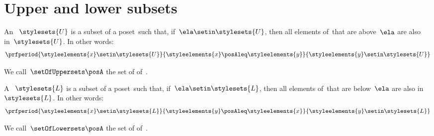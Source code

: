 
\section{Upper and lower subsets}
\label{sec:UpperLowerSets}

\begin{definition}
    \label{def:upperset}
    An ~$\stylesets{U}$ is a subset of a poset~\posA such that, if~$\ela \setin \stylesets{U}$, then all elements of~\posA that are above~$\ela$ are also in~$\stylesets{U}$.
    In other words:
    \begin{equation}
        \prfperiod{\styleelements{x}\setin \stylesets{U}}{\styleelements{x}\posAleq \styleelements{y}}{\styleelements{y}\setin \stylesets{U}}
    \end{equation}
\end{definition}
We call~$\setOfUppersets \posA$ the set of  of~\posA.

\begin{definition}
    \label{def:lowerset}
    A ~$\stylesets{L}$ is a subset of a poset~\posA such that, if~$\ela \setin \stylesets{L}$, then all elements of~\posA that are below~$\ela$ are also in~$\stylesets{L}$.
    In other words:
    \begin{equation}
        \prfperiod{\styleelements{x}\setin \stylesets{L}}{\styleelements{y}\posAleq \styleelements{x}}{\styleelements{y}\setin \stylesets{L}}
    \end{equation}
\end{definition}
We call~$\setOfLowersets\posA$ the set of  of~\posA.
%

